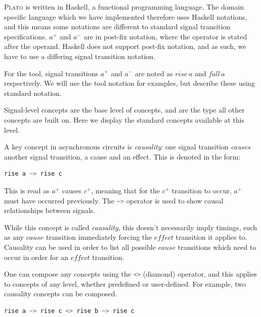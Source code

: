 \documentclass[british,conference,compsoc]{IEEEtran}
\newcommand{\noun}[1]{\textsc{#1}}
\begin{document}
\noun{Plato} is written in Haskell, a functional programming language. The 
domain specific language which we have implemented therefore uses Haskell 
notations, and this means some notations are different to standard signal 
transition specifications. $a^{+}$ and $a^{-}$ are in post-fix notation, where 
the operator is stated after the operand. Haskell does not support post-fix 
notation, and as such, we have to use a differing signal transition notation. 

For the tool, signal transitions $a^{+}$ and $a^{-}$ are noted as $rise\,a$ and 
$fall\,a$ respectively. We will use the tool notation for examples, but 
describe these using standard notation.

Signal-level concepts are the base level of concepts, and are 
the type all other concepts are built on. Here we display the standard concepts
available at this level.

A key concept in asynchronous circuits is \emph{causality}:
one signal transition \emph{causes} another signal transition, a cause and an 
effect. This is denoted in the form: 

\begin{lstlisting}[language=haskell]
	         rise a ~> rise c
\end{lstlisting}

\vspace{-1mm}

This is read as $a^{+}$ causes $c^{+}$, meaning that for the $c^{+}$ transition 
to occur, $a^{+}$ must have occurred previously. The 
\lstinline[language=haskell]{~>}
operator is used to show causal relationships between signals.
 
While this concept is called \emph{causality}, this doesn't necessarily imply
timings, such as any $\mathit{cause}$ transition immediately forcing the
 $\mathit{effect}$ transition it applies to. Causality can be used in order to
list all possible $\mathit{cause}$ transitions which need to occur in order
 for an $\mathit{effect}$ transition.

One can compose any concepts using the \lstinline[language=haskell]{<>} 
(diamond) operator, and this applies
to concepts of any level, whether predefined or user-defined. For example, 
two causality concepts can be composed.

\begin{lstlisting}[language=haskell]
       rise a ~> rise c <> rise b ~> rise c
\end{lstlisting}
\end{document}
